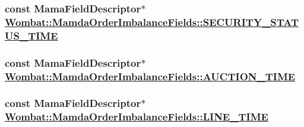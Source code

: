 \hypertarget{classWombat_1_1MamdaOrderImbalanceFields_fe6e8c1af3f7177a87268718b948797f}{
\subsubsection[SECURITY\_\-STATUS\_\-TIME]{\setlength{\rightskip}{0pt plus 5cm}const Mama\-Field\-Descriptor$\ast$ \hyperlink{classWombat_1_1MamdaOrderImbalanceFields_fe6e8c1af3f7177a87268718b948797f}{Wombat::Mamda\-Order\-Imbalance\-Fields::SECURITY\_\-STATUS\_\-TIME}}}
\label{classWombat_1_1MamdaOrderImbalanceFields_fe6e8c1af3f7177a87268718b948797f}


\hypertarget{classWombat_1_1MamdaOrderImbalanceFields_669f3da9005778673c5950850f4448de}{
\subsubsection[AUCTION\_\-TIME]{\setlength{\rightskip}{0pt plus 5cm}const Mama\-Field\-Descriptor$\ast$ \hyperlink{classWombat_1_1MamdaOrderImbalanceFields_669f3da9005778673c5950850f4448de}{Wombat::Mamda\-Order\-Imbalance\-Fields::AUCTION\_\-TIME}}}
\label{classWombat_1_1MamdaOrderImbalanceFields_669f3da9005778673c5950850f4448de}


\hypertarget{classWombat_1_1MamdaOrderImbalanceFields_a67c444baa249c161165903ed1054b63}{
\subsubsection[LINE\_\-TIME]{\setlength{\rightskip}{0pt plus 5cm}const Mama\-Field\-Descriptor$\ast$ \hyperlink{classWombat_1_1MamdaOrderImbalanceFields_a67c444baa249c161165903ed1054b63}{Wombat::Mamda\-Order\-Imbalance\-Fields::LINE\_\-TIME}}}
\label{classWombat_1_1MamdaOrderImbalanceFields_a67c444baa249c161165903ed1054b63}


